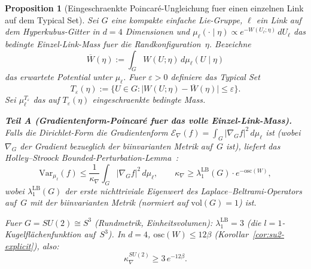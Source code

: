 \documentclass[12pt,a4paper]{article}
\theoremstyle{definition}
\theoremstyle{plain}
\newtheorem{proposition}[definition]{Proposition}
\theoremstyle{remark}
\begin{document}
\begin{proposition}[Eingeschraenkte Poincar\'e-Ungleichung fuer einen einzelnen Link auf dem Typical Set]
\label{prop:restricted-poincare}
Sei $G$ eine kompakte einfache Lie-Gruppe, $\ell$ ein Link auf dem Hyperkubus-Gitter in $d = 4$ Dimensionen und $\mu_\ell(\cdot \mid \eta) \propto e^{-W(U_\ell; \eta)}\,dU_\ell$ das bedingte Einzel-Link-Mass fuer die Randkonfiguration~$\eta$. Bezeichne
\[
    \overline{W}(\eta) := \int_G W(U;\eta)\,d\mu_\ell(U \mid \eta)
\]
das erwartete Potential unter $\mu_\ell$. Fuer $\varepsilon > 0$ definiere das \emph{Typical Set}
\begin{equation}\label{eq:typical-set}\label{def:typical-set}
    T_\varepsilon(\eta) := \bigl\{U \in G : \bigl|W(U;\eta) - \overline{W}(\eta)\bigr| \leq \varepsilon\bigr\}.
\end{equation}
Sei $\mu_\ell^{T_\varepsilon}$ das auf $T_\varepsilon(\eta)$ eingeschraenkte bedingte Mass.

\medskip
\noindent\textbf{Teil A (Gradientenform-Poincar\'e fuer das volle Einzel-Link-Mass).}
Falls die Dirichlet-Form die Gradientenform $\mathcal{E}_\nabla(f) = \int_G |\nabla_G f|^2\,d\mu_\ell$ ist (wobei $\nabla_G$ der Gradient bezueglich der biinvarianten Metrik auf~$G$ ist), liefert das Holley--Stroock Bounded-Perturbation-Lemma~\cite{HolleyStroock1987}:
\begin{equation}\label{eq:gradient-poincare-link}
    \mathrm{Var}_{\mu_\ell}(f) \leq \frac{1}{\kappa_\nabla}\int_G |\nabla_G f|^2\,d\mu_\ell, \qquad \kappa_\nabla \geq \lambda_1^{\mathrm{LB}}(G)\cdot e^{-\mathrm{osc}(W)},
\end{equation}
wobei $\lambda_1^{\mathrm{LB}}(G)$ der erste nichttriviale Eigenwert des Laplace--Beltrami-Operators auf~$G$ mit der biinvarianten Metrik (normiert auf $\mathrm{vol}(G) = 1$) ist.

Fuer $G = SU(2) \cong S^3$ (Rundmetrik, Einheitsvolumen): $\lambda_1^{\mathrm{LB}} = 3$ (die $l=1$-Kugelfl\"achenfunktion auf~$S^3$). In $d=4$, $\mathrm{osc}(W) \leq 12\beta$ (Korollar~\ref{cor:su2-explicit}), also:
\begin{equation}\label{eq:gradient-poincare-su2}
    \kappa_\nabla^{SU(2)} \geq 3\,e^{-12\beta}.
\end{equation}


\end{proposition}
\end{document}
